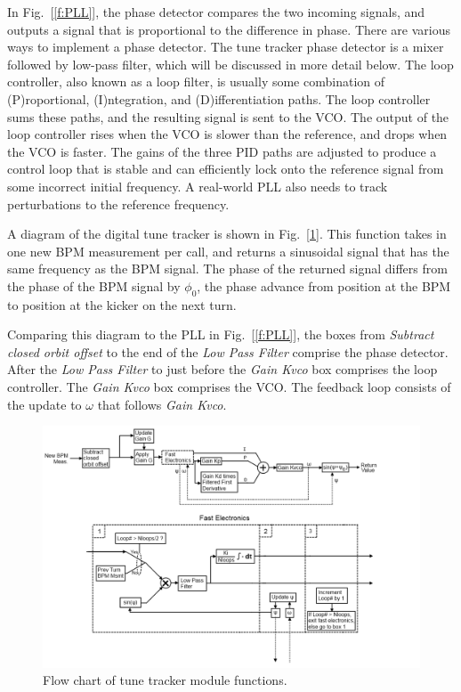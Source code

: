 In Fig.~[\ref{f:PLL}], the phase detector compares the two incoming
signals, and outputs a signal that is proportional to the difference
in phase.  There are various ways to implement a phase detector.  The
tune tracker phase detector is a mixer followed by low-pass filter,
which will be discussed in more detail below.  The loop controller,
also known as a loop filter, is usually some combination of
(P)roportional, (I)ntegration, and (D)ifferentiation paths.  The loop
controller sums these paths, and the resulting signal is sent to the
VCO.  The output of the loop controller rises when the VCO is slower
than the reference, and drops when the VCO is faster.  The gains of
the three PID paths are adjusted to produce a control loop that is
stable and can efficiently lock onto the reference signal from some
incorrect initial frequency.  A real-world PLL also needs to track
perturbations to the reference frequency.

A diagram of the digital tune tracker is shown in
Fig.~[\ref{f:CdTT}].  This function takes in one new BPM measurement
per call, and returns a sinusoidal signal that has the same frequency
as the BPM signal.  The phase of the returned signal differs from the
phase of the BPM signal by $\phi_0$, the phase advance from position
at the BPM to position at the kicker on the next turn.

Comparing this diagram to the PLL in Fig.~[\ref{f:PLL}], the boxes
from {\it Subtract closed orbit offset} to the end of the {\it Low
Pass Filter} comprise the phase detector.  After the {\it Low Pass
Filter} to just before the {\it Gain Kvco} box comprises the loop
controller.  The {\it Gain Kvco} box comprises the VCO.  The feedback
loop consists of the update to $\omega$ that follows {\it Gain Kvco}.

\begin{figure}
\includegraphics[width=\columnwidth]{TT-Flow.png}
\caption{
Flow chart of tune tracker module functions.}
\label{f:CdTT}
\end{figure}

